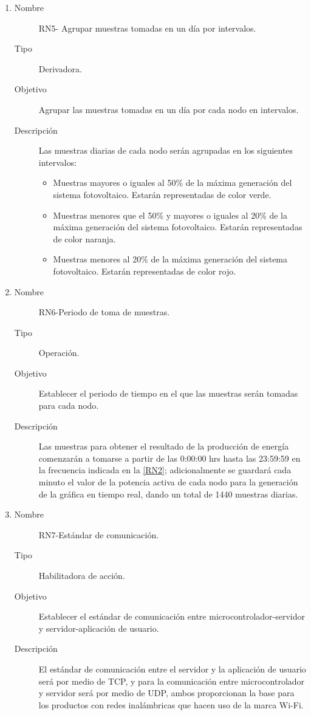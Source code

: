 \begin{enumerate}[label=RN\arabic*.]
\item \label{RN5}
		\begin{description}
			\item[Nombre] RN5- Agrupar muestras tomadas en un día por intervalos.
			\item[Tipo] Derivadora.
			\item[Objetivo] Agrupar las muestras tomadas en un día por cada nodo en intervalos.
			\item[Descripción] Las muestras diarias de cada nodo serán agrupadas en los siguientes intervalos:
			\begin{itemize}
				\item Muestras mayores o iguales al 50\% de la máxima generación del sistema fotovoltaico. Estarán representadas de color verde.  
				\item Muestras menores que el 50\% y mayores o iguales al 20\% de la máxima generación del sistema fotovoltaico. Estarán representadas de color naranja. 
				\item Muestras menores al 20\% de la máxima generación del sistema fotovoltaico. Estarán representadas de color rojo. 
			\end{itemize}
		\end{description}

\item \label{RN6}
		\begin{description}
			\item[Nombre] RN6-Periodo de toma de muestras.
			\item[Tipo] Operación.
			\item[Objetivo] Establecer el periodo de tiempo en el que las muestras serán tomadas para cada nodo.
			\item[Descripción] Las muestras para obtener el resultado de la producción de energía comenzarán a tomarse a partir de las 0:00:00 hrs hasta las 23:59:59 en la frecuencia indicada en la \ref{RN2}; adicionalmente se guardará cada minuto el valor de la potencia activa de cada nodo para la generación de la gráfica en tiempo real, dando un total de 1440 muestras diarias.		
		\end{description}
		
\item \label{RN7}
		\begin{description}
			\item[Nombre] RN7-Estándar de comunicación.
			\item[Tipo] Habilitadora de acción.
			\item[Objetivo] Establecer el estándar de comunicación entre microcontrolador-servidor y servidor-aplicación de usuario.
			\item[Descripción] El estándar de comunicación entre el servidor y la aplicación de usuario será por medio de TCP, y para la comunicación entre microcontrolador y servidor será por medio de UDP, ambos proporcionan la base para los productos con redes inalámbricas que hacen uso de la marca Wi-Fi.
		\end{description}
		

\end{enumerate}
